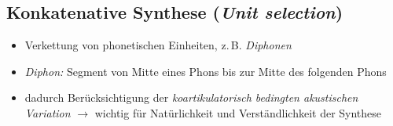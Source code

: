 \documentclass[11pt]{book}
\begin{document}
  \subsection*{Konkatenative Synthese (\emph{Unit selection})}

  \begin{itemize}
  \item Verkettung von phonetischen Einheiten, z.\,B. \emph{Diphonen}
  \item \emph{Diphon:} Segment von Mitte eines Phons bis zur Mitte des folgenden Phons
  \item dadurch Berücksichtigung der \emph{koartikulatorisch bedingten akustischen Variation} $\longrightarrow$ wichtig für Natürlichkeit und Verständlichkeit der Synthese
  \end{itemize}
\end{document}
